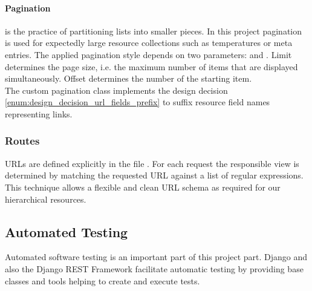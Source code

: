 \paragraph{Pagination} is the practice of partitioning lists into smaller pieces.
In this project pagination is used for expectedly large resource collections such as temperatures or meta entries.
The applied pagination style depends on two parameters:  and .
Limit determines the page size, i.e. the maximum number of items that are displayed simultaneously.
Offset determines the number of the starting item.\\
The custom pagination class  implements the design decision \ref{enum:design_decision_url_fields_prefix} to suffix resource field names representing links.

\subsubsection{Routes}
\label{sec:server_infrastructure_routers}

URLs are defined explicitly in the file .
For each request the responsible view is determined by matching the requested URL against a list of regular expressions.
This technique allows a flexible and clean URL schema as required for our hierarchical resources.



\subsection{Automated Testing}
\label{sec:server_infrastructure_testing}

Automated software testing is an important part of this project part. Django and also the Django REST Framework facilitate automatic testing by providing base classes and tools helping to create and execute tests.

